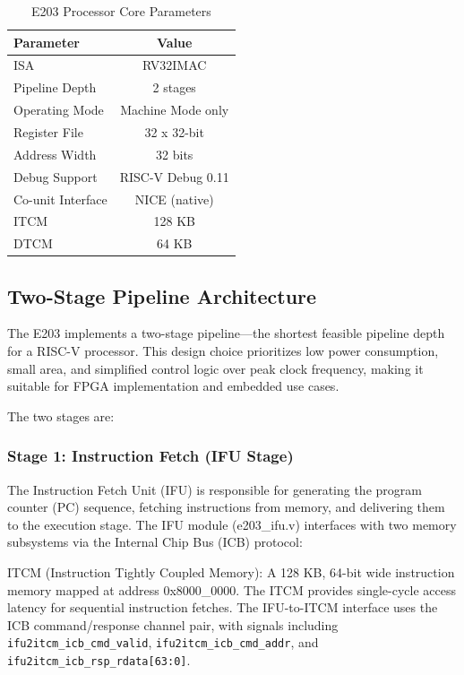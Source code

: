 \begin{table}[htbp]
\centering
\caption{E203 Processor Core Parameters}
\label{tab:2_1}
\begin{tabular}{lc}
\hline
Parameter & Value \\ \hline\hline
ISA & RV32IMAC \\ \hline
Pipeline Depth & 2 stages \\ \hline
Operating Mode & Machine Mode only \\ \hline
Register File & 32 x 32-bit \\ \hline
Address Width & 32 bits \\ \hline
Debug Support & RISC-V Debug 0.11 \\ \hline
Co-unit Interface & NICE (native) \\ \hline
ITCM & 128 KB \\ \hline
DTCM & 64 KB \\ \hline
\end{tabular}
\end{table}

\subsection{Two-Stage Pipeline Architecture}

The E203 implements a two-stage pipeline—the shortest feasible pipeline depth for a RISC-V processor. This design choice prioritizes low power consumption, small area, and simplified control logic over peak clock frequency, making it suitable for FPGA implementation and embedded use cases.


The two stages are:


\subsubsection{Stage 1: Instruction Fetch (IFU Stage)}

The Instruction Fetch Unit (IFU) is responsible for generating the program counter (PC) sequence, fetching instructions from memory, and delivering them to the execution stage. The IFU module (e203\_ifu.v) interfaces with two memory subsystems via the Internal Chip Bus (ICB) protocol:


ITCM (Instruction Tightly Coupled Memory): A 128 KB, 64-bit wide instruction memory mapped at address 0x8000\_0000. The ITCM provides single-cycle access latency for sequential instruction fetches. The IFU-to-ITCM interface uses the ICB command/response channel pair, with signals including \texttt{ifu2itcm\_icb\_\-cmd\_\-valid}, \texttt{ifu2itcm\_icb\_\-cmd\_\-addr}, and \texttt{ifu2itcm\_\-icb\_\-rsp\_\-rdata[63:0]}.


